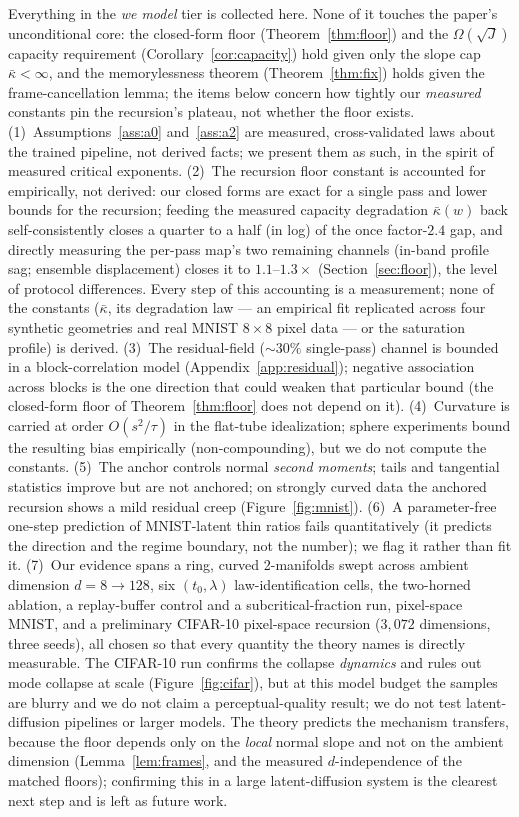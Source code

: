 \documentclass[11pt]{article}
\theoremstyle{remark}
\newcommand{\kb}{\bar\kappa}
\begin{document}
Everything in the \emph{we model} tier is collected here. None of it touches the paper's
unconditional core: the closed-form floor (Theorem~\ref{thm:floor}) and the
$\Omega(\sqrt J)$ capacity requirement (Corollary~\ref{cor:capacity}) hold given only the
slope cap $\kb<\infty$, and the memorylessness theorem (Theorem~\ref{thm:fix}) holds given
the frame-cancellation lemma; the items below concern how tightly our \emph{measured}
constants pin the recursion's plateau, not whether the floor exists.
(1)~Assumptions~\ref{ass:a0} and~\ref{ass:a2} are measured, cross-validated laws about the
trained pipeline, not derived facts; we present them as such, in the spirit of measured
critical exponents.
(2)~The recursion floor constant is accounted for empirically, not derived: our closed
forms are exact for a single pass and lower bounds for the recursion; feeding the
measured capacity degradation $\kb(w)$ back self-consistently closes a quarter to a
half (in log) of the once factor-$2.4$ gap, and directly measuring the per-pass map's
two remaining channels (in-band profile sag; ensemble displacement) closes it to
$1.1$--$1.3\times$ (Section~\ref{sec:floor}), the level of protocol differences. Every
step of this accounting is a measurement; none of the constants ($\kb$, its
degradation law --- an empirical fit replicated across four synthetic geometries and
real MNIST $8\times8$ pixel data --- or the saturation profile) is derived.
(3)~The residual-field ($\sim30\%$ single-pass) channel is bounded in a
block-correlation model (Appendix~\ref{app:residual}); negative association across
blocks is the one direction that could weaken that particular bound (the closed-form
floor of Theorem~\ref{thm:floor} does not depend on it).
(4)~Curvature is carried at order $O(s^2/\tau)$ in the flat-tube idealization; sphere
experiments bound the resulting bias empirically (non-compounding), but we do not
compute the constants.
(5)~The anchor controls normal \emph{second moments}; tails and tangential statistics
improve but are not anchored; on strongly curved data the anchored recursion shows a
mild residual creep (Figure~\ref{fig:mnist}).
(6)~A parameter-free one-step prediction of MNIST-latent thin ratios fails
quantitatively (it predicts the direction and the regime boundary, not the number); we
flag it rather than fit it.
(7)~Our evidence spans a ring, curved 2-manifolds swept across ambient dimension
$d=8\to128$, six $(t_0,\lambda)$ law-identification cells, the two-horned ablation,
a replay-buffer control and a subcritical-fraction run,
pixel-space MNIST, and a preliminary CIFAR-10 pixel-space recursion ($3{,}072$ dimensions,
three seeds), all chosen so that every quantity the theory names is directly measurable. The
CIFAR-10 run confirms the collapse \emph{dynamics} and rules out mode collapse at scale
(Figure~\ref{fig:cifar}), but at this model budget the samples are blurry and we do not
claim a perceptual-quality result; we do not test latent-diffusion pipelines or
larger models. The theory predicts the mechanism transfers, because the floor depends only
on the \emph{local} normal slope and not on the ambient dimension (Lemma~\ref{lem:frames},
and the measured $d$-independence of the matched floors); confirming this in a large
latent-diffusion system is the clearest next step and is left as future work.
\end{document}
